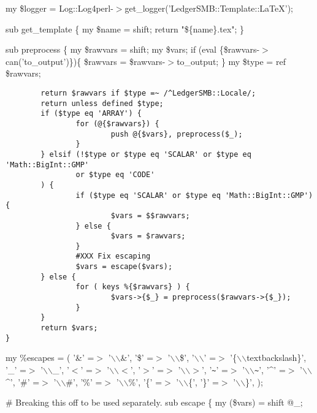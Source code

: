\begin{description}
\begin{description}
\begin{description}
\begin{description}
\begin{description}
\begin{description}
\begin{description}
\begin{description}
\begin{description}
\begin{description}
my \$logger = Log::Log4perl-$>$get\_logger('LedgerSMB::Template::LaTeX');



sub get\_template \{
	my \$name = shift;
	return "\$\{name\}.tex";
\}



sub preprocess \{
	my \$rawvars = shift;
	my \$vars;
        if (eval \{\$rawvars-$>$can('to\_output')\})\{
           \$rawvars = \$rawvars-$>$to\_output;
        \}
	my \$type = ref \$rawvars;

\begin{verbatim}
        return $rawvars if $type =~ /^LedgerSMB::Locale/;
        return unless defined $type;
        if ($type eq 'ARRAY') {
                for (@{$rawvars}) {
                        push @{$vars}, preprocess($_);
                }
        } elsif (!$type or $type eq 'SCALAR' or $type eq 'Math::BigInt::GMP'
                or $type eq 'CODE'
        ) {
                if ($type eq 'SCALAR' or $type eq 'Math::BigInt::GMP') {
                        $vars = $$rawvars;
                } else {
                        $vars = $rawvars;
                }
                #XXX Fix escaping
                $vars = escape($vars);
        } else {
                for ( keys %{$rawvars} ) {
                        $vars->{$_} = preprocess($rawvars->{$_});
                }
        }
        return $vars;
}
\end{verbatim}


my \%escapes = (
   '\&' =$>$ '$\backslash$$\backslash$\&',
   '\$' =$>$ '$\backslash$$\backslash$\$',
   '$\backslash$$\backslash$' =$>$ '\{$\backslash$$\backslash$textbackslash\}',
   '\_' =$>$ '$\backslash$$\backslash$\_',
   '$<$' =$>$ '$\backslash$$\backslash$$<$',
   '$>$' =$>$ '$\backslash$$\backslash$$>$',
   '\texttt{\~{}}' =$>$ '$\backslash$$\backslash$\texttt{\~{}}',
   '\^{}' =$>$ '$\backslash$$\backslash$\^{}',
   '\#' =$>$ '$\backslash$$\backslash$\#',
   '\%' =$>$ '$\backslash$$\backslash$\%',
   '\{' =$>$ '$\backslash$$\backslash$\{',
   '\}' =$>$ '$\backslash$$\backslash$\}',
  );



\# Breaking this off to be used separately.
sub escape \{
    my (\$vars) = shift @\_;


\end{description}
\end{description}
\end{description}
\end{description}
\end{description}
\end{description}
\end{description}
\end{description}
\end{description}
\end{description}
